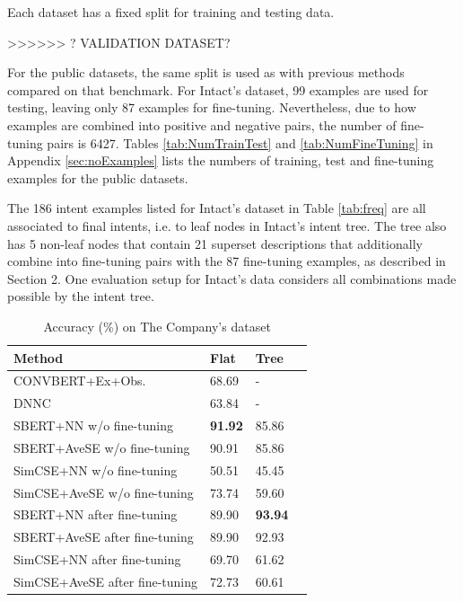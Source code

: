\documentclass[sigconf, anonymous=true]{acmart}
\begin{document}
Each dataset has a fixed split for training and testing data. 

>>>>>> ? VALIDATION DATASET?

For the public datasets, the same split is used as with previous methods compared on that benchmark. For Intact's dataset, 99 examples are used for testing, leaving only 87 examples for fine-tuning. Nevertheless, due to how examples are combined into positive and negative pairs, the number of fine-tuning pairs is 6427. Tables \ref{tab:NumTrainTest} and \ref{tab:NumFineTuning} in Appendix \ref{sec:noExamples} lists the numbers of training, test and fine-tuning examples for the public datasets. 

The 186 intent examples listed for Intact's dataset in Table \ref{tab:freq} are all associated to final intents, i.e. to leaf nodes in Intact's intent tree. The tree also has 5 non-leaf nodes that contain 21 superset descriptions that additionally combine into fine-tuning pairs with the 87 fine-tuning examples, as described in Section 2. One evaluation setup for Intact's data considers all combinations made possible by the intent tree. 

\begin{table}[b]
\setlength{} %
\footnotesize\centering
\begin{tabular}{llll}
\hline \textbf{Method} & \textbf{Flat} & \textbf{Tree} \\
\hline
CONVBERT+Ex+Obs. & 68.69 & - \\
DNNC & 63.84 & - \\
\hline SBERT+NN w/o fine-tuning & \textbf{91.92} & 85.86  \\
SBERT+AveSE w/o fine-tuning & 90.91 & 85.86  \\
SimCSE+NN w/o fine-tuning & 50.51 & 45.45  \\
SimCSE+AveSE w/o fine-tuning & 73.74 & 59.60  \\
\midrule
SBERT+NN after fine-tuning & 89.90 & \textbf{93.94}  \\
SBERT+AveSE after fine-tuning & 89.90 & 92.93  \\
SimCSE+NN after fine-tuning & 69.70 & 61.62  \\
SimCSE+AveSE after fine-tuning & 72.73 & 60.61  \\
\midrule
\end{tabular}
\caption{Accuracy (\%) on The Company's dataset}
\label{tab:accuracyIntact}
\end{table}
\end{document}
